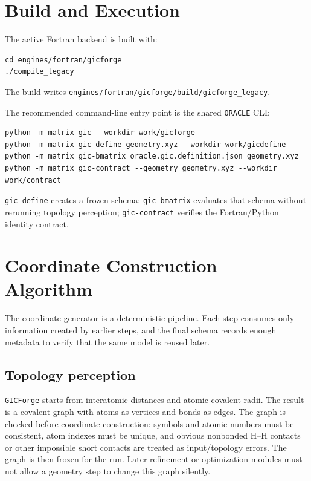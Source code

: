\documentclass[11pt]{article}
\newcommand{\program}{\texttt{GICForge}}
\newcommand{\oracle}{\texttt{ORACLE}}
\begin{document}
\section{Build and Execution}

The active Fortran backend is built with:

\begin{lstlisting}[style=oracle]
cd engines/fortran/gicforge
./compile_legacy
\end{lstlisting}

\noindent
The build writes \texttt{engines/fortran/gicforge/build/gicforge\_legacy}.

The recommended command-line entry point is the shared \oracle{} CLI:

\begin{lstlisting}[style=oracle]
python -m matrix gic --workdir work/gicforge
python -m matrix gic-define geometry.xyz --workdir work/gicdefine
python -m matrix gic-bmatrix oracle.gic.definition.json geometry.xyz
python -m matrix gic-contract --geometry geometry.xyz --workdir work/contract
\end{lstlisting}

\noindent
\texttt{gic-define} creates a frozen schema; \texttt{gic-bmatrix} evaluates that
schema without rerunning topology perception; \texttt{gic-contract} verifies the
Fortran/Python identity contract.

\section{Coordinate Construction Algorithm}

The coordinate generator is a deterministic pipeline.  Each step consumes only
information created by earlier steps, and the final schema records enough
metadata to verify that the same model is reused later.

\subsection{Topology perception}

\program{} starts from interatomic distances and atomic covalent radii.  The
result is a covalent graph with atoms as vertices and bonds as edges.  The graph
is checked before coordinate construction: symbols and atomic numbers must be
consistent, atom indexes must be unique, and obvious nonbonded H--H contacts or
other impossible short contacts are treated as input/topology errors.  The graph
is then frozen for the run.  Later refinement or optimization modules must not
allow a geometry step to change this graph silently.
\end{document}
